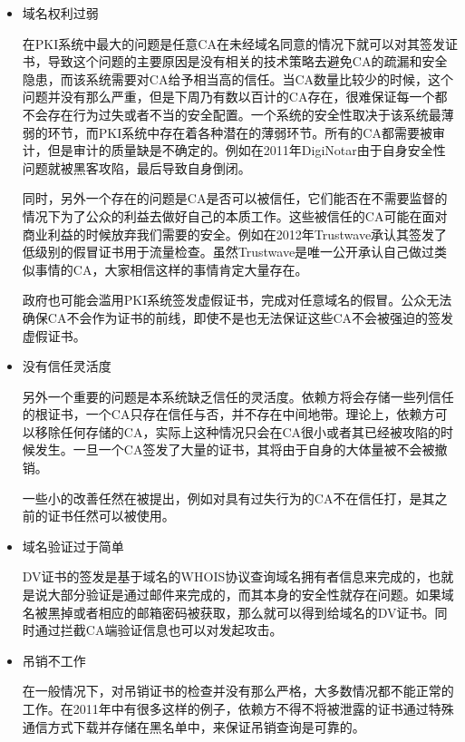 \begin{itemize}
	\item

	域名权利过弱

	在PKI系统中最大的问题是任意CA在未经域名同意的情况下就可以对其签发证书，导致这个问题的主要原因是没有相关的技术策略去避免CA的疏漏和安全隐患，而该系统需要对CA给予相当高的信任。当CA数量比较少的时候，这个问题并没有那么严重，但是下周乃有数以百计的CA存在，很难保证每一个都不会存在行为过失或者不当的安全配置。一个系统的安全性取决于该系统最薄弱的环节，而PKI系统中存在着各种潜在的薄弱环节。所有的CA都需要被审计，但是审计的质量缺是不确定的。例如在2011年DigiNotar由于自身安全性问题就被黑客攻陷，最后导致自身倒闭。

	同时，另外一个存在的问题是CA是否可以被信任，它们能否在不需要监督的情况下为了公众的利益去做好自己的本质工作。这些被信任的CA可能在面对商业利益的时候放弃我们需要的安全。例如在2012年Trustwave承认其签发了低级别的假冒证书用于流量检查。虽然Trustwave是唯一公开承认自己做过类似事情的CA，大家相信这样的事情肯定大量存在。

	政府也可能会滥用PKI系统签发虚假证书，完成对任意域名的假冒。公众无法确保CA不会作为证书的前线，即使不是也无法保证这些CA不会被强迫的签发虚假证书。



	\item

	没有信任灵活度

	另外一个重要的问题是本系统缺乏信任的灵活度。依赖方将会存储一些列信任的根证书，一个CA只存在信任与否，并不存在中间地带。理论上，依赖方可以移除任何存储的CA，实际上这种情况只会在CA很小或者其已经被攻陷的时候发生。一旦一个CA签发了大量的证书，其将由于自身的大体量被不会被撤销。

	一些小的改善任然在被提出，例如对具有过失行为的CA不在信任打，是其之前的证书任然可以被使用。

	\item

	域名验证过于简单

	DV证书的签发是基于域名的WHOIS协议查询域名拥有者信息来完成的，也就是说大部分验证是通过邮件来完成的，而其本身的安全性就存在问题。如果域名被黑掉或者相应的邮箱密码被获取，那么就可以得到给域名的DV证书。同时通过拦截CA端验证信息也可以对发起攻击。



	\item 

	吊销不工作

	在一般情况下，对吊销证书的检查并没有那么严格，大多数情况都不能正常的工作。在2011年中有很多这样的例子，依赖方不得不将被泄露的证书通过特殊通信方式下载并存储在黑名单中，来保证吊销查询是可靠的。


\end{itemize}
